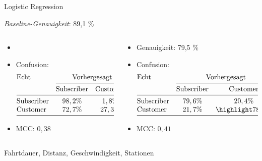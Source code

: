 \begin{frame}{Logistic Regression}

\emph{Baseline-Genauigkeit}: 89,1 \%

\begin{columns}
\begin{column}{0.5\textwidth}
{
\begin{itemize}
\item {}
\item Confusion:
\[
\begin{array}{@{}l*{5}{c}@{}}
\text{Echt} & \multicolumn{2}{c@{}}{\text{Vorhergesagt}}\\
    \cmidrule(l){2-3}
    & \text{Subscriber} & \text{Customer}\\
\midrule
\text{Subscriber} & 98,2\% & 1,8 \% \\
\text{Customer}   & 72,7 \% & 27,3 \% \\
\bottomrule
\end{array}
\]
\item MCC: $0,38$
\end{itemize}
}
\end{column}
\begin{column}{0.5\textwidth}
{
\begin{itemize}
\item Genauigkeit: 79,5 \%
\item Confusion:
\[
\begin{array}{@{}l*{5}{c}@{}}
\text{Echt} & \multicolumn{2}{c@{}}{\text{Vorhergesagt}}\\
    \cmidrule(l){2-3}
    & \text{Subscriber} & \text{Customer}\\
\midrule
\text{Subscriber} & 79,6\% & 20,4 \% \\
\text{Customer}   & 21,7 \% & \highlight{78,3 \%} \\
\bottomrule
\end{array}
\]
\item MCC: $0,41$
\end{itemize}
}
\end{column}
\end{columns}

{
Fahrtdauer, Distanz, Geschwindigkeit, Stationen
}
\end{frame}

